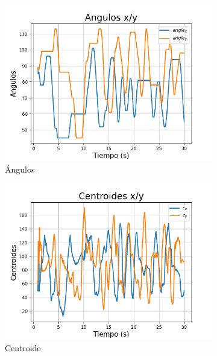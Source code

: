 \documentclass[12pt, oneside]{article}
\begin{document}
{\sffamily\large\justify
    \begin{figure}[h!]
        \centering

        \begin{subfigure}{0.4\textwidth}
            \centering
            \includegraphics[width=\linewidth]{angulos.png}
            \caption{\sffamily Ángulos}
        \end{subfigure}
        \begin{subfigure}{0.4\textwidth}
            \centering
            \includegraphics[width=\linewidth]{centroide.png}
            \caption{\sffamily Centroide}
        \end{subfigure}
        \begin{subfigure}{0.4\textwidth}

\end{subfigure}
\end{figure}}
\end{document}
